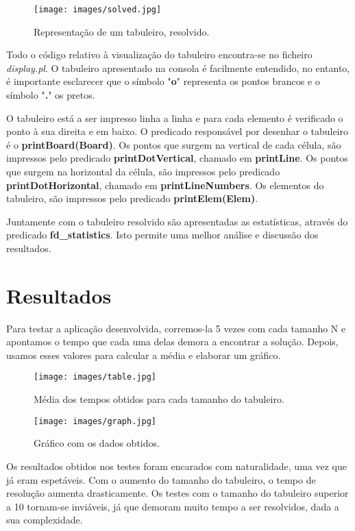 \documentclass[runningheads,a4paper]{llncs}
\begin{document}
\begin{figure}[H]
	\centering
	\texttt{[image: images/solved.jpg]}
	\caption{Representação de um tabuleiro, resolvido.}
	\label{fig:solved}
\end{figure}

Todo o código relativo à visualização do tabuleiro encontra-se no ficheiro \textit{display.pl}. O tabuleiro apresentado na consola é facilmente entendido, no entanto, é importante esclarecer que o símbolo "\textbf{o}" representa os pontos brancos e o símbolo "\textbf{.}" os pretos.       

O tabuleiro está a ser impresso linha a linha e para cada elemento é verificado o ponto à sua direita e em baixo. O predicado responsável por desenhar o tabuleiro é o \textbf{printBoard(Board)}. Os pontos que surgem na vertical de cada célula, são impressos pelo predicado \textbf{printDotVertical}, chamado em \textbf{printLine}. Os pontos que surgem na horizontal da célula, são impressos pelo predicado \textbf{printDotHorizontal}, chamado em \textbf{printLineNumbers}. Os elementos do tabuleiro, são impressos pelo predicado \textbf{printElem(Elem)}. 

Juntamente com o tabuleiro resolvido são apresentadas as estatísticas, através do predicado \textbf{fd\_statistics}. Isto permite uma melhor análise e discussão dos resultados.    

\section{Resultados}

Para testar a aplicação desenvolvida, corremos-la 5 vezes com cada tamanho N e apontamos o tempo que cada uma delas demora a encontrar a solução. Depois, usamos esses valores para calcular a média e elaborar um gráfico. 

\begin{figure}[H]
	\centering
	\texttt{[image: images/table.jpg]}
	\caption{Média dos tempos obtidos para cada tamanho do tabuleiro.}
	\label{fig:table}
\end{figure}

\begin{figure}[H]
	\centering
	\texttt{[image: images/graph.jpg]}
	\caption{Gráfico com os dados obtidos.}
	\label{fig:graph}
\end{figure}
 
Os resultados obtidos nos testes foram encarados com naturalidade, uma vez que já eram espetáveis. Com o aumento do tamanho do tabuleiro, o tempo de resolução aumenta drasticamente. Os testes com o tamanho do tabuleiro superior a 10 tornam-se inviáveis, já que demoram muito tempo a ser resolvidos, dada a sua complexidade. 
\end{document}
